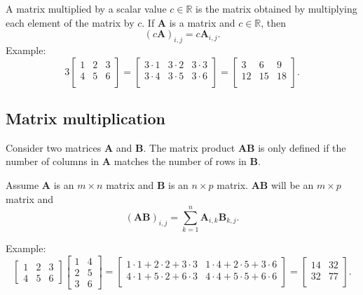 \documentclass[
]{book}
\theoremstyle{definition}
\theoremstyle{definition}
\theoremstyle{definition}
\theoremstyle{definition}
\theoremstyle{remark}
\begin{document}
A matrix multiplied by a scalar value \(c\in\mathbb{R}\) is the matrix obtained by multiplying each element of the matrix by \(c\). If \(\mathbf{A}\) is a matrix and \(c\in \mathbb{R}\), then
\[(c\mathbf{A})_{i,j} = c\mathbf{A}_{i,j}.\]
Example:
\[
3\begin{bmatrix}
1 & 2 & 3 \\
4 & 5 & 6 \\
\end{bmatrix}=
\begin{bmatrix}
3\cdot 1 & 3\cdot 2 & 3\cdot 3 \\
3\cdot 4 & 3\cdot 5 & 3\cdot 6 \\
\end{bmatrix}=
\begin{bmatrix}
3 & 6 & 9 \\
12 & 15 & 18 \\
\end{bmatrix}.
\]

\hypertarget{matrix-multiplication}{%
\subsection{Matrix multiplication}\label{matrix-multiplication}}

Consider two matrices \(\mathbf{A}\) and \(\mathbf{B}\). The matrix product \(\mathbf{AB}\) is only defined if the number of columns in \(\mathbf{A}\) matches the number of rows in \(\mathbf{B}\).

Assume \(\mathbf{A}\) is an \(m\times n\) matrix and \(\mathbf{B}\) is an \(n\times p\) matrix. \(\mathbf{AB}\) will be an \(m\times p\) matrix and \[(\mathbf{AB})_{i,j} = \sum_{k=1}^{n} \mathbf{A}_{i,k}\mathbf{B}_{k,j}.\]

Example:
\[
\begin{bmatrix}
1 & 2 & 3 \\
4 & 5 & 6
\end{bmatrix}
\begin{bmatrix}
1 & 4\\
2 & 5\\
3 & 6
\end{bmatrix}=
\begin{bmatrix}
1\cdot 1 +  2 \cdot 2 + 3 \cdot 3 & 1 \cdot 4 + 2 \cdot 5 + 3 \cdot 6\\
4\cdot 1 +  5 \cdot 2 + 6 \cdot 3 & 4 \cdot 4 + 5 \cdot 5 + 6 \cdot 6\\
\end{bmatrix}=
\begin{bmatrix}
14 & 32\\
32 & 77\\
\end{bmatrix}.
\]
\end{document}
